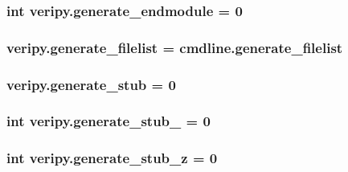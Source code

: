 \hypertarget{namespaceveripy_aa38fc4edf33670a01086cbc8d7aca1f8}{
\subsubsection[{generate\-\_\-endmodule}]{\setlength{\rightskip}{0pt plus 5cm}int veripy.\-generate\-\_\-endmodule = 0}}\label{namespaceveripy_aa38fc4edf33670a01086cbc8d7aca1f8}
\hypertarget{namespaceveripy_a8b88691a75f930c9c74bc8e53e4a3ae7}{
\subsubsection[{generate\-\_\-filelist}]{\setlength{\rightskip}{0pt plus 5cm}veripy.\-generate\-\_\-filelist = cmdline.\-generate\-\_\-filelist}}\label{namespaceveripy_a8b88691a75f930c9c74bc8e53e4a3ae7}
\hypertarget{namespaceveripy_a69c679478700bfe8e617efd46659b04b}{
\subsubsection[{generate\-\_\-stub}]{\setlength{\rightskip}{0pt plus 5cm}veripy.\-generate\-\_\-stub = 0}}\label{namespaceveripy_a69c679478700bfe8e617efd46659b04b}
\hypertarget{namespaceveripy_a4629f2bdb1a9239da0eb7ef127e1e48d}{
\subsubsection[{generate\-\_\-stub\-\_\-0}]{\setlength{\rightskip}{0pt plus 5cm}int veripy.\-generate\-\_\-stub\-\_ = 0}}\label{namespaceveripy_a4629f2bdb1a9239da0eb7ef127e1e48d}
\hypertarget{namespaceveripy_aeed0f7abed041e5ca9bbf9eba4a24416}{
\subsubsection[{generate\-\_\-stub\-\_\-z}]{\setlength{\rightskip}{0pt plus 5cm}int veripy.\-generate\-\_\-stub\-\_\-z = 0}}\label{namespaceveripy_aeed0f7abed041e5ca9bbf9eba4a24416}
